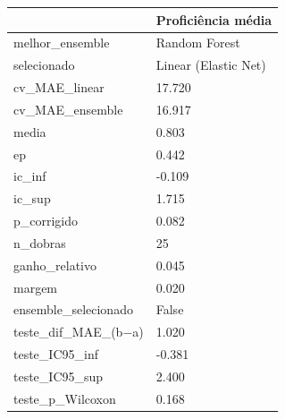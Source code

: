 \begin{tabular}{ll}
\toprule
 & Proficiência média \\
\midrule
melhor\_ensemble & Random Forest \\
selecionado & Linear (Elastic Net) \\
cv\_MAE\_linear & 17.720 \\
cv\_MAE\_ensemble & 16.917 \\
media & 0.803 \\
ep & 0.442 \\
ic\_inf & -0.109 \\
ic\_sup & 1.715 \\
p\_corrigido & 0.082 \\
n\_dobras & 25 \\
ganho\_relativo & 0.045 \\
margem & 0.020 \\
ensemble\_selecionado & False \\
teste\_dif\_MAE\_(b−a) & 1.020 \\
teste\_IC95\_inf & -0.381 \\
teste\_IC95\_sup & 2.400 \\
teste\_p\_Wilcoxon & 0.168 \\
\bottomrule
\end{tabular}
